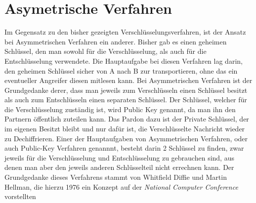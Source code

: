 \documentclass[10pt, a4paper,headsepline]{scrreprt}
\begin{document}
\section{Asymetrische Verfahren}
Im Gegensatz zu den bisher gezeigten Verschlüsselungsverfahren, ist der Ansatz bei Asymmetrischen Verfahren ein anderer. Bisher gab es einen geheimen Schlüssel, den man sowohl für die Verschlüsselung, als auch für die Entschlüsselung verwendete. Die Hauptaufgabe bei diesen Verfahren lag darin, den geheimen Schlüssel sicher von A nach B zur transportieren, ohne das ein eventueller Angreifer diesen mitlesen kann. Bei Asymmetrischen Verfahren ist der Grundgedanke derer, dass man jeweils zum Verschlüsseln einen Schlüssel besitzt als auch zum Entschlüsseln einen separaten Schlüssel. Der Schlüssel, welcher für die Verschlüsselung zuständig ist, wird Public Key genannt, da man ihn den Partnern öffentlich zuteilen kann. Das Pardon dazu ist der Private Schlüssel, der im eigenen Besitzt bleibt und nur dafür ist, die Verschlüsselte Nachricht wieder zu Dechiffrieren. Einer der Hauptaufgaben von Asymmetrischen Verfahren, oder auch Public-Key Verfahren genannnt, besteht darin 2 Schlüssel zu finden, zwar jeweils für die Verschlüsselung und Entschlüsselung zu gebrauchen sind, aus denen man aber den jeweils anderen Schlüsselteil nicht errechnen kann. Der Grundgedanke dieses Verfahrens stammt von Whitfield Diffie und Martin Hellman, die hierzu 1976 ein Konzept auf der \textit{National Computer Conference} vorstellten \citep[S. 525]{book:angewandte-krypto}
\end{document}
